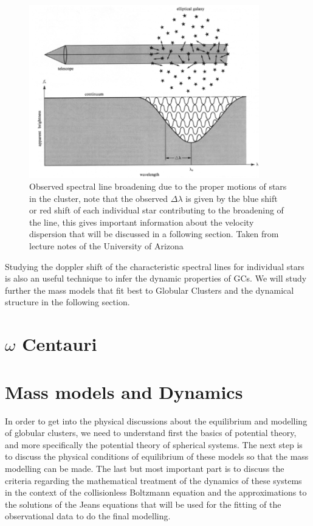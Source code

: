 \begin{figure}[H]
\centering
\includegraphics[width=10cm]{images/4_gcs.png}
\caption[Spectral line broadening]{Observed spectral line broadening due to the proper motions of stars in the cluster, note that the observed $\Delta\lambda$ is given by the blue shift or red shift of each individual star contributing to the broadening of the line, this gives important information about the velocity dispersion that will be discussed in a following section. Taken from lecture notes of the University of Arizona}
\end{figure}

Studying the doppler shift of the characteristic spectral lines for individual stars is also an useful technique to infer the dynamic properties of GCs. We will study further the mass models that fit best to Globular Clusters and the dynamical structure in the following section.

\section{$\omega$ Centauri}

\section{Mass models and Dynamics}

In order to get into the physical discussions about the equilibrium and modelling of globular clusters, we need to understand first the basics of potential theory, and more specifically the potential theory of spherical systems. The next step is to discuss the physical conditions of equilibrium of these models so that the mass modelling can be made. The last but most important part is to discuss the criteria regarding the mathematical treatment of the dynamics of these systems in the context of the collisionless Boltzmann equation and the approximations to the solutions of the Jeans equations that will be used for the fitting of the observational data to do the final modelling.

